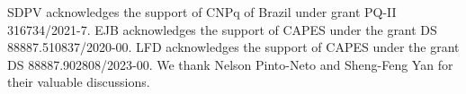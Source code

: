 \documentclass[a4paper,11pt]{article}
\begin{document}
SDPV acknowledges the support of CNPq of Brazil under grant PQ-II 316734/2021-7. EJB acknowledges the support of CAPES under the grant DS 88887.510837/2020-00. LFD acknowledges the support of CAPES under the grant DS 88887.902808/2023-00. We thank Nelson Pinto-Neto and Sheng-Feng Yan for their valuable discussions.




\end{document}

